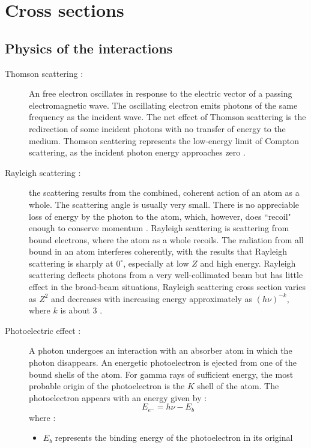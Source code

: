 \section{Cross sections}

\subsection{Physics of the interactions}

\begin{description}
\item [Thomson scattering :] An free electron oscillates in response to the 
electric vector of a passing electromagnetic wave. The oscillating electron 
emits photons of the same frequency as the incident wave. The net effect of 
Thomson scattering is the redirection of
some incident photons with no transfer of energy to the medium. Thomson
scattering represents the low-energy limit of Compton scattering, as the
incident photon energy approaches zero \cite{radiation}.
\item [Rayleigh scattering :] the scattering results from the combined,
coherent action of an atom as a whole. The scattering angle is usually very
small. There is no appreciable loss of energy by the photon to the atom,
which, however, does ``recoil" enough to conserve momentum \cite{radiation}.
Rayleigh scattering is scattering from bound electrons, where the atom as a
whole recoils. The radiation from all bound in an atom interferes coherently,
with the results that Rayleigh scattering is sharply at $0^{\circ}$,
especially at low $Z$ and high energy. Rayleigh scattering deflects photons from
a very well-collimated beam but has little effect in the broad-beam
situations, Rayleigh scattering cross section varies as $Z^2$ and decreases
with increasing energy approximately as $(h \nu)^{-k}$, where $k$ is about 3
\cite{shielding}.
\item [Photoelectric effect :] A photon undergoes an interaction with an
absorber atom in which the photon disappears. An energetic photoelectron is
ejected from one of the bound shells of the atom. For gamma rays of
sufficient energy, the most probable origin of the photoelectron is the $K$
shell of the atom. The photoelectron appears with an energy given by :
\begin{equation}
E_{e^-} = h\nu -E_b
\end{equation}
where :
\begin{itemize}
\item $E_b$ represents the binding energy of the photoelectron in its original

\end{itemize}
\end{description}
